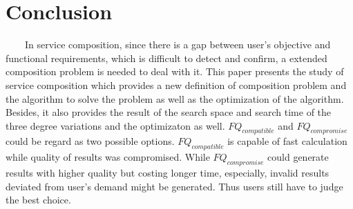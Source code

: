 \documentclass[senior,final,11pt]{iscs-thesis}
\begin{document}
\chapter{Conclusion}
~~~~In service composition, since there is a gap between user's objective and functional requirements, which is difficult to detect and confirm, a extended composition problem is needed to deal with it. This paper presents the study of service composition which provides a new definition of composition problem and the algorithm to solve the problem as well as the optimization of the algorithm. Besides, it also provides the result of the search space and search time of the three degree variations and the optimizaton as well.  
$FQ_{compatible}$ and $FQ_{compromise}$ could be regard as two possible options. $FQ_{compatible}$ is capable of fast calculation while quality of results was compromised.  While $FQ_{compromise}$ could generate results with higher quality but costing longer time, especially, invalid results deviated from user’s demand might be generated. Thus users still have to judge the best choice. 



 
 
\end{document}
